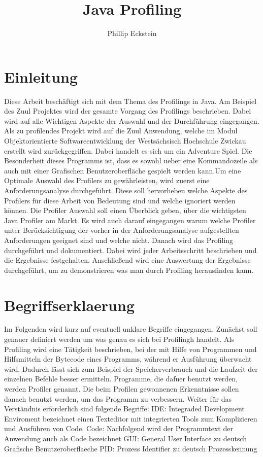 \documentclass{article}
\author{Phillip Eckstein}
\title{Java Profiling}
\begin{document}
    
\maketitle
\tableofcontents

\pagebreak

\section{Einleitung}
Diese Arbeit beschäftigt sich mit dem Thema des Profilings in Java. Am Beispiel des Zuul Projektes wird der gesamte Vorgang des Profilings beschrieben. Dabei wird auf alle Wichtigen Aspekte der Auswahl und der Durchführung eingegangen. Als zu profilendes Projekt wird auf die Zuul Anwendung, welche im Modul Objektorientierte Softwareentwicklung der Westsächsisch Hochschule Zwickau erstellt wird zurückgegriffen. Dabei handelt es sich um ein Adventure Spiel. Die Besonderheit dieses Programms ist, dass es sowohl ueber eine Kommandozeile als auch mit einer Grafischen Benutzeroberfläche gespielt werden kann.Um eine Optimale Auswahl des Profilers zu gewährleisten, wird zuerst eine Anforderungsanalyse durchgeführt. Diese soll hervorheben welche Aspekte des Profilers für diese Arbeit von Bedeutung sind und welche ignoriert werden können. Die Profiler Auswahl soll einen Überblick geben, über die wichtigsten Java Profiler am Markt. Es wird auch darauf eingegangen warum welche Profiler unter Berücksichtigung der vorher in der Anforderungsanalyse aufgestellten Anforderungen geeignet sind und welche nicht. Danach wird das Profiling durchgeführt und dokumentiert. Dabei wird jeder Arbeitsschritt beschrieben und die Ergebnisse festgehalten. Anschließend wird eine Auswertung der Ergebnisse durchgeführt, um zu demonstrieren was man durch Profiling herausfinden kann.


\section{Begriffserklaerung}

Im Folgenden wird kurz auf eventuell unklare Begriffe eingegangen. Zunächst soll genauer definiert werden um was genau es sich bei Profilingh handelt. Als Profiling wird eine Tätigkeit beschrieben, bei der mit Hilfe von Programmen und Hilfsmitteln der Bytecode eines Programms, während er Ausführung überwacht wird. Dadurch lässt sich zum Beispiel der Speicherverbrauch und die Laufzeit der einzelnen Befehle besser ermitteln. Programme, die dafuer benutzt werden, werden Profiler genannt. Die beim Profilen gewonnenen Erkenntnisse sollen danach benutzt werden, um das Programm zu verbessern. Weiter für das Verständnis erforderlich sind folgende Begriffe:
IDE: Integraded Development Enviroment bezeichnet einen Texteditor mit integrierten Tools zum Komplizieren und Ausführen von Code.
Code: Nachfolgend wird der Programmtext der Anwendung auch als Code bezeichnet
GUI:  General User Interface  zu deutsch Grafische Benutzeroberflaeche
PID: Prozess Identifier zu deutsch Prozesskennung ~\cite{WEBSITE:6}
\end{document}
